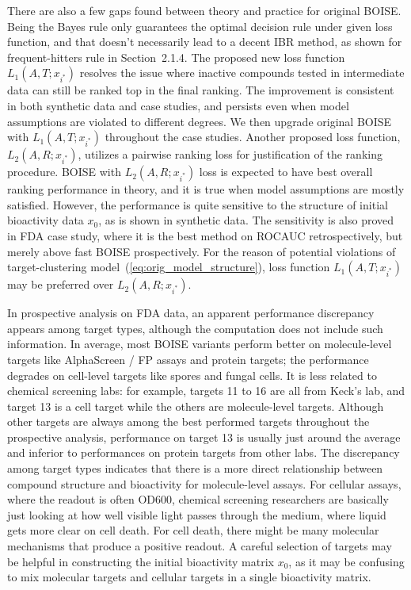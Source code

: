 \documentclass[11pt,a4paper]{article}
\theoremstyle{plain}
\begin{document}
There are also a few gaps found between theory and practice for original BOISE. Being the Bayes rule only guarantees the optimal decision rule under given loss function, and that doesn't necessarily lead to a decent IBR method, as shown for frequent-hitters rule in Section~2.1.4. The proposed new loss function $L_1(A, T; x_{i^*})$ resolves the issue where inactive compounds tested in intermediate data can still be ranked top in the final ranking. The improvement is consistent in both synthetic data and case studies, and persists even when model assumptions are violated to different degrees. We then upgrade original BOISE with $L_1(A, T; x_{i^*})$ throughout the case studies. Another proposed loss function, $L_2(A, R; x_{i^*})$, utilizes a pairwise ranking loss for justification of the ranking procedure. BOISE with $L_2(A, R; x_{i^*})$ loss is expected to have best overall ranking performance in theory, and it is true when model assumptions are mostly satisfied. However, the performance is quite sensitive to the structure of initial bioactivity data $x_0$, as is shown in synthetic data. The sensitivity is also proved in FDA case study, where it is the best method on ROCAUC retrospectively, but merely above fast BOISE prospectively. For the reason of potential violations of target-clustering model~(\ref{eq:orig_model_structure}), loss function $L_1(A, T; x_{i^*})$ may be preferred over $L_2(A, R; x_{i^*})$. 

In prospective analysis on FDA data, an apparent performance discrepancy appears among target types, although the computation does not include such information. 
In average, most BOISE variants perform better on molecule-level targets like AlphaScreen / FP assays and protein targets; the performance degrades on cell-level targets like spores and fungal cells. 
It is less related to chemical screening labs: for example, targets 11 to 16 are all from Keck's lab, and target 13 is a cell target while the others are molecule-level targets. Although other targets are always among the best performed targets throughout the prospective analysis, performance on target 13 is usually just around the average and inferior to performances on protein targets from other labs. 
The discrepancy among target types indicates that there is a more direct relationship between compound structure and bioactivity for molecule-level assays. For cellular assays, where the readout is often OD600, chemical screening researchers are basically just looking at how well visible light passes through the medium, where liquid gets more clear on cell death. For cell death, there might be many molecular mechanisms that produce a positive readout. 
A careful selection of targets may be helpful in constructing the initial bioactivity matrix $x_0$, as it may be confusing to mix molecular targets and cellular targets in a single bioactivity matrix.

\clearpage
	
        
\end{document}

